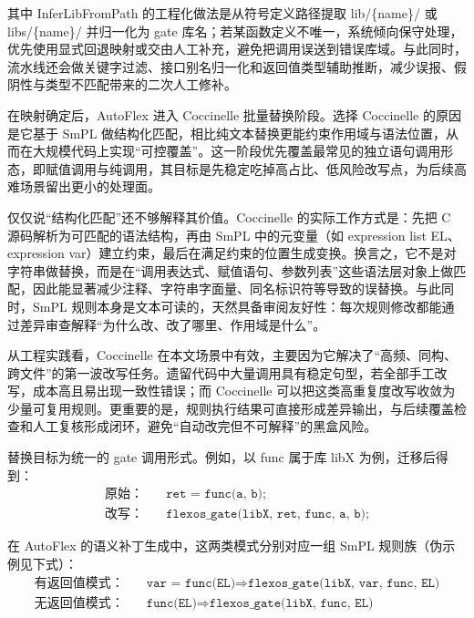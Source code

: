 \documentclass[UTF8,a4paper,12pt,twoside]{ctexart}  %
\begin{document}
其中 InferLibFromPath 的工程化做法是从符号定义路径提取 lib/\{name\}/ 或
libs/\{name\}/ 并归一化为 gate
库名；若某函数定义不唯一，系统倾向保守处理，优先使用显式回退映射或交由人工补充，避免把调用误送到错误库域。与此同时，流水线还会做关键字过滤、接口别名归一化和返回值类型辅助推断，减少误报、假阴性与类型不匹配带来的二次人工修补。

在映射确定后，AutoFlex 进入 Coccinelle 批量替换阶段。选择 Coccinelle
的原因是它基于 SmPL
做结构化匹配\cite{10,26}，相比纯文本替换更能约束作用域与语法位置，从而在大规模代码上实现``可控覆盖''。这一阶段优先覆盖最常见的独立语句调用形态，即赋值调用与纯调用，其目标是先稳定吃掉高占比、低风险改写点，为后续高难场景留出更小的处理面。

仅仅说``结构化匹配''还不够解释其价值。Coccinelle 的实际工作方式是：先把
C 源码解析为可匹配的语法结构，再由 SmPL 中的元变量（如 expression list
EL、expression
var）建立约束，最后在满足约束的位置生成变换。换言之，它不是对字符串做替换，而是在``调用表达式、赋值语句、参数列表''这些语法层对象上做匹配，因此能显著减少注释、字符串字面量、同名标识符等导致的误替换。与此同时，SmPL
规则本身是文本可读的，天然具备审阅友好性：每次规则修改都能通过差异审查解释``为什么改、改了哪里、作用域是什么''。

从工程实践看，Coccinelle
在本文场景中有效，主要因为它解决了``高频、同构、跨文件''的第一波改写任务。遗留代码中大量调用具有稳定句型，若全部手工改写，成本高且易出现一致性错误；而
Coccinelle
可以把这类高重复度改写收敛为少量可复用规则。更重要的是，规则执行结果可直接形成差异输出，与后续覆盖检查和人工复核形成闭环，避免``自动改完但不可解释''的黑盒风险。

替换目标为统一的 gate 调用形式。例如，以 func 属于库 libX
为例，迁移后得到：
\begin{equation}
  \begin{aligned}
    \text{原始：}\quad & \texttt{ret = func(a, b);}                    \\
    \text{改写：}\quad & \texttt{flexos\_gate(libX, ret, func, a, b);}
  \end{aligned}
\end{equation}

在 AutoFlex 的语义补丁生成中，这两类模式分别对应一组 SmPL
规则族（伪示例见下式）：
\begin{equation}
  \begin{aligned}
    \text{有返回值模式：}\quad & \texttt{var = func(EL)} \Rightarrow \texttt{flexos\_gate(libX, var, func, EL)} \\
    \text{无返回值模式：}\quad & \texttt{func(EL)} \Rightarrow \texttt{flexos\_gate(libX, func, EL)}
  \end{aligned}
\end{equation}
\end{document}
